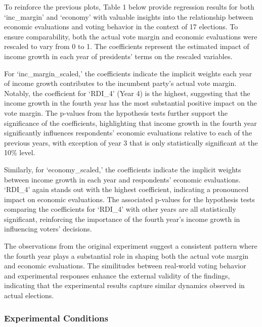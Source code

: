\documentclass[
]{article}
\begin{document}
To reinforce the previous plots, Table 1 below provide regression
results for both `inc\_margin' and `economy' with valuable insights into
the relationship between economic evaluations and voting behavior in the
context of 17 elections. To ensure comparability, both the actual vote
margin and economic evaluations were rescaled to vary from 0 to 1. The
coefficients represent the estimated impact of income growth in each
year of presidents' terms on the rescaled variables.

For `inc\_margin\_scaled,' the coefficients indicate the implicit
weights each year of income growth contributes to the incumbent party's
actual vote margin. Notably, the coefficient for `RDI\_4' (Year 4) is
the highest, suggesting that the income growth in the fourth year has
the most substantial positive impact on the vote margin. The p-values
from the hypothesis tests further support the significance of the
coefficients, highlighting that income growth in the fourth year
significantly influences respondents' economic evaluations relative to
each of the previous years, with exception of year 3 that is only
statistically significant at the 10\% level.

Similarly, for `economy\_scaled,' the coefficients indicate the implicit
weights between income growth in each year and respondents' economic
evaluations. `RDI\_4' again stands out with the highest coefficient,
indicating a pronounced impact on economic evaluations. The associated
p-values for the hypothesis tests comparing the coefficients for
`RDI\_4' with other years are all statistically significant, reinforcing
the importance of the fourth year's income growth in influencing voters'
decisions.



The observations from the original experiment suggest a consistent
pattern where the fourth year plays a substantial role in shaping both
the actual vote margin and economic evaluations. The similitudes between
real-world voting behavior and experimental responses enhance the
external validity of the findings, indicating that the experimental
results capture similar dynamics observed in actual elections.

\hypertarget{experimental-conditions}{%
\subsubsection{Experimental Conditions}\label{experimental-conditions}}
\end{document}
